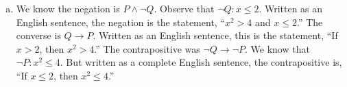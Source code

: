 \documentclass[11pt,letterpaper]{article}
\begin{document}
\begin{enumerate}[(a)]
\item We know the negation is $P \wedge \neg Q$. Observe that $\neg Q: x \leq 2$. Written as an English sentence, the negation is the statement, ``$x^2 > 4$ and $x \leq 2$.'' The converse is $Q \to P$. Written as an English sentence, this is the statement, ``If $x > 2$, then $x^2 > 4$.'' The contrapositive was $\neg Q \to \neg P$. We know that $\neg P: x^2 \leq 4$. But written as a complete English sentence, the contrapositive is, ``If $x \leq 2$, then $x^2 \leq 4$.'' 








\end{enumerate}
\end{document}
